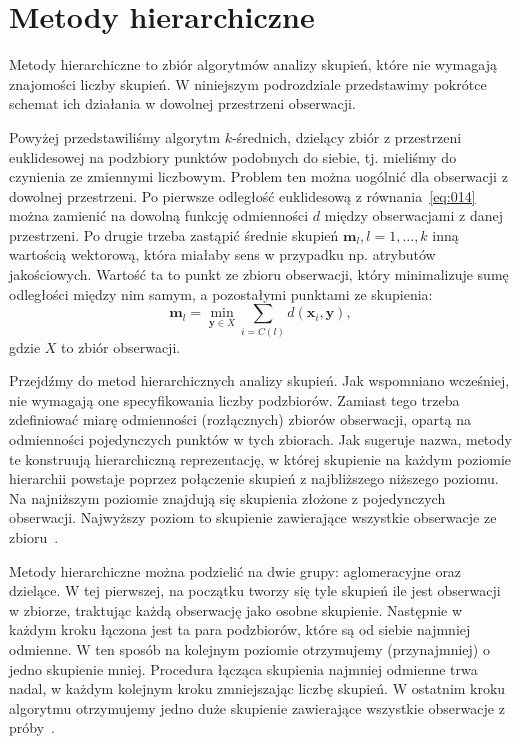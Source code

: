 \documentclass{praca1}
\begin{document}
\section{Metody hierarchiczne}

Metody hierarchiczne to zbiór algorytmów analizy skupień, które nie wymagają znajomości liczby skupień. W niniejszym podrozdziale przedstawimy pokrótce schemat ich działania w dowolnej przestrzeni obserwacji.

Powyżej przedstawiliśmy algorytm $k$-średnich, dzielący zbiór z przestrzeni euklidesowej na podzbiory punktów podobnych do siebie, tj. mieliśmy do czynienia ze zmiennymi liczbowym. Problem ten można uogólnić dla obserwacji z dowolnej przestrzeni. Po pierwsze odległość euklidesową z równania~\ref{eq:014} można zamienić na dowolną funkcję odmienności $d$ między obserwacjami z danej przestrzeni. Po drugie trzeba zastąpić średnie skupień $\mathbf{m}_l, l=1,\ldots,k$ inną wartością wektorową, która miałaby sens w przypadku np. atrybutów jakościowych. Wartość ta to punkt ze zbioru obserwacji, który minimalizuje sumę odległości między nim samym, a pozostałymi punktami ze skupienia:
\begin{equation}
\mathbf{m}_l = \min\limits_{\mathbf{y} \in X} \sum\limits_{i = C(l)} d(\mathbf{x}_i, \mathbf{y}),
\end{equation}
gdzie $X$ to zbiór obserwacji.

Przejdźmy do metod hierarchicznych analizy skupień. Jak wspomniano wcześniej, nie wymagają one specyfikowania liczby podzbiorów. Zamiast tego trzeba zdefiniować miarę odmienności (rozłącznych) zbiorów obserwacji, opartą na odmienności pojedynczych punktów w tych zbiorach. Jak sugeruje nazwa, metody te konstruują hierarchiczną reprezentację, w której skupienie na każdym poziomie hierarchii powstaje poprzez połączenie skupień z najbliższego niższego poziomu. Na najniższym poziomie znajdują się skupienia złożone z pojedynczych obserwacji. Najwyższy poziom to skupienie zawierające wszystkie obserwacje ze zbioru~\cite{Hastie2009:elements}.

Metody hierarchiczne można podzielić na dwie grupy: aglomeracyjne oraz dzielące. W tej pierwszej, na początku tworzy się tyle skupień ile jest obserwacji w zbiorze, traktując każdą obserwację jako osobne skupienie. Następnie w każdym kroku łączona jest ta para podzbiorów, które są od siebie najmniej odmienne. W ten sposób na kolejnym poziomie otrzymujemy (przynajmniej) o jedno skupienie mniej. Procedura łącząca skupienia najmniej odmienne trwa nadal, w każdym kolejnym kroku zmniejszając liczbę skupień. W ostatnim kroku algorytmu otrzymujemy jedno duże skupienie zawierające wszystkie obserwacje z próby~\cite{Hastie2009:elements, Koronacki2005:statystyczne}.
\end{document}
